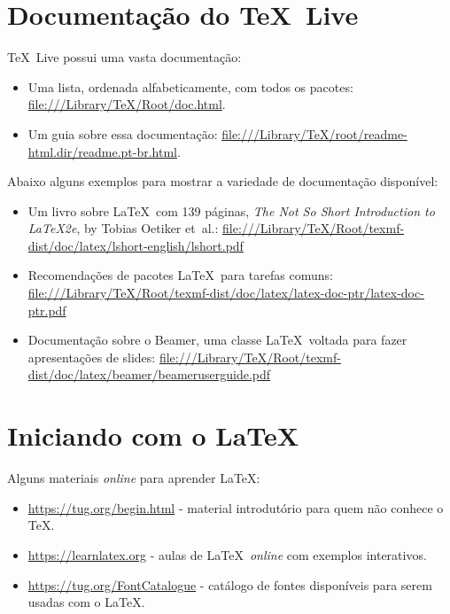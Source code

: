 \documentclass[11pt, oneside]{article}
\begin{document}
\pagestyle{empty}

\section{Documentação do \TeX\ Live}

\TeX\ Live possui uma vasta documentação:

\begin{itemize}
\item Uma lista, ordenada alfabeticamente, com todos os pacotes:
\url{file:///Library/TeX/Root/doc.html}.

\item Um guia sobre essa documentação:
\url{file:///Library/TeX/root/readme-html.dir/readme.pt-br.html}.
\end{itemize}

Abaixo alguns exemplos para mostrar a variedade de documentação disponível:

\begin{itemize}

\item Um livro sobre \LaTeX\ com 139 páginas, \emph {The Not So Short Introduction to
\LaTeX 2e}, by Tobias Oetiker et~al.:
\url{file:///Library/TeX/Root/texmf-dist/doc/latex/lshort-english/lshort.pdf}
     
\item Recomendações de pacotes \LaTeX\ para tarefas comuns: \url{file:///Library/TeX/Root/texmf-dist/doc/latex/latex-doc-ptr/latex-doc-ptr.pdf}

\item Documentação sobre o Beamer, uma classe \LaTeX\ voltada para fazer apresentações de slides:
\url{file:///Library/TeX/Root/texmf-dist/doc/latex/beamer/beameruserguide.pdf}

\end{itemize}



\section{Iniciando com o \LaTeX}

Alguns materiais \textit{online} para aprender \LaTeX:

\begin{itemize}
\item \url{https://tug.org/begin.html} - material introdutório para quem não conhece o \TeX.

\item \url{https://learnlatex.org} - aulas de \LaTeX\ \textit{online} com exemplos interativos.

\item \url{https://tug.org/FontCatalogue} - catálogo de fontes disponíveis para serem usadas com o \LaTeX.

\end{itemize}
\end{document}
